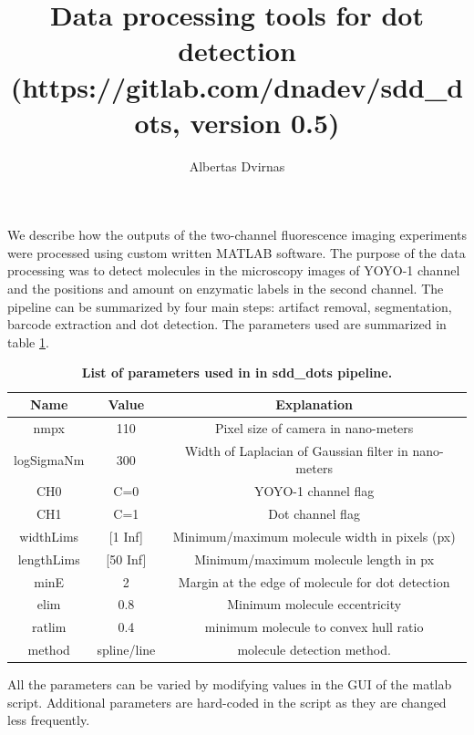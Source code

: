 \documentclass{article}
\title{Data processing tools for dot detection (https://gitlab.com/dnadev/sdd\_dots, version 0.5)}
\author{Albertas Dvirnas}
\begin{document}
%
\maketitle
%

We describe how the outputs of the two-channel fluorescence imaging experiments were processed using custom written MATLAB software. The purpose of the data processing was to detect molecules in the microscopy images of YOYO-1 channel and the positions and amount on enzymatic labels in the second channel. The pipeline can be summarized by four main steps: artifact removal, segmentation, barcode extraction and dot detection. The parameters used are summarized in table \ref{table:1}.

\begin{table}[h!]
	\centering
	\caption{{\bf List of parameters used in in sdd\_dots pipeline.}}
	\begin{tabular}{|c|c|c|}
		\hline
		Name & Value & Explanation \\
		\hline
		nmpx & 110 & Pixel size of camera in nano-meters\\
		logSigmaNm & 300 & Width of Laplacian of Gaussian filter in nano-meters\\
	  CH0 & C=0 & 	YOYO-1 channel flag\\
	  CH1 & C=1 & 	Dot channel flag\\
		widthLims & [1 Inf] & Minimum/maximum molecule width in pixels (px)\\
		lengthLims & [50 Inf] & Minimum/maximum molecule length in px\\
		minE & 2 & Margin at the edge of molecule for dot detection\\
	elim & 0.8 & Minimum molecule eccentricity\\
		ratlim & 0.4 & minimum molecule to convex hull ratio\\
		method &spline/line & molecule detection method.\\
		\hline
	\end{tabular}
	\begin{flushleft}
		All the parameters can be varied by modifying values in the GUI of the matlab script. Additional parameters are hard-coded in the script as they are changed less frequently.
	\end{flushleft}
	\label{table:1}
\end{table} 
\end{document}

